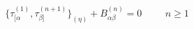 \begin{equation}
  \{\tau_{[\alpha}^{(1)},\tau_{\beta ]}^{(n+1)}\}_{(\eta)}+B_{\alpha\beta}^{(n)}=0 \hspace{1cm}
  n\geq 1
  \label{a9}
  \end{equation}

